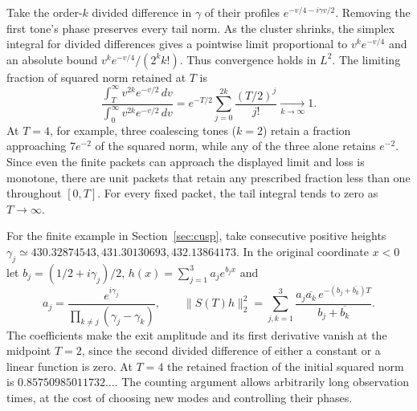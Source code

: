 \documentclass[11pt,letterpaper]{article}
\numberwithin{equation}{section}
\begin{document}
Take the order-$k$ divided difference in $\gamma$ of their profiles $e^{-v/4-i\gamma v/2}$. Removing the first tone's phase preserves every tail norm. As the cluster shrinks, the simplex integral for divided differences gives a pointwise limit proportional to $v^k e^{-v/4}$ and an absolute bound $v^k e^{-v/4}/(2^kk!)$. Thus convergence holds in $L^2$. The limiting fraction of squared norm retained at $T$ is
\[
 \frac{\int_T^\infty v^{2k}e^{-v/2}\,dv}{\int_0^\infty v^{2k}e^{-v/2}\,dv}
 =e^{-T/2}\sum_{j=0}^{2k}\frac{(T/2)^j}{j!}\xrightarrow[k\to\infty]{} 1 .
\]
At $T=4$, for example, three coalescing tones ($k=2$) retain a fraction approaching $7e^{-2}$ of the squared norm, while any of the three alone retains $e^{-2}$. Since even the finite packets can approach the displayed limit and loss is monotone, there are unit packets that retain any prescribed fraction less than one throughout $[0,T]$. For every fixed packet, the tail integral tends to zero as $T\to\infty$.

For the finite example in Section~\ref{sec:cusp}, take consecutive positive heights $\gamma_j\simeq 430.32874543,431.30130693,432.13864173$. In the original coordinate $x<0$ let $b_j=(1/2+i\gamma_j)/2$, $h(x)=\sum_{j=1}^3 a_j e^{b_jx}$ and
\[
 a_j=\frac{e^{i\gamma_j}}{\prod_{k\ne j}(\gamma_j-\gamma_k)},\qquad
 \|S(T)h\|_2^2=\sum_{j,k=1}^3
 \frac{a_j\overline{a_k}\, e^{-(b_j+\overline{b_k})T}}{b_j+\overline{b_k}} .
\]
The coefficients make the exit amplitude and its first derivative vanish at the midpoint $T=2$, since the second divided difference of either a constant or a linear function is zero. At $T=4$ the retained fraction of the initial squared norm is $0.85750985011732\ldots$. The counting argument allows arbitrarily long observation times, at the cost of choosing new modes and controlling their phases.
\end{document}
